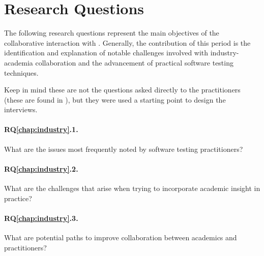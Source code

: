 \section{Research Questions}
\label{sec:ind_rqs}

The following research questions represent the main objectives of the collaborative interaction with .
Generally, the contribution of this period is the identification and explanation of notable challenges involved with industry-academia collaboration and the advancement of practical software testing techniques.

Keep in mind these are not the questions asked directly to the practitioners (these are found in ), but they were used a starting point to design the interviews.

\paragraph{RQ\ref{chap:industry}.1.} What are the issues most frequently noted by software testing practitioners?
\paragraph{RQ\ref{chap:industry}.2.} What are the challenges that arise when trying to incorporate academic insight in practice?
\paragraph{RQ\ref{chap:industry}.3.} What are potential paths to improve collaboration between academics and practitioners?
